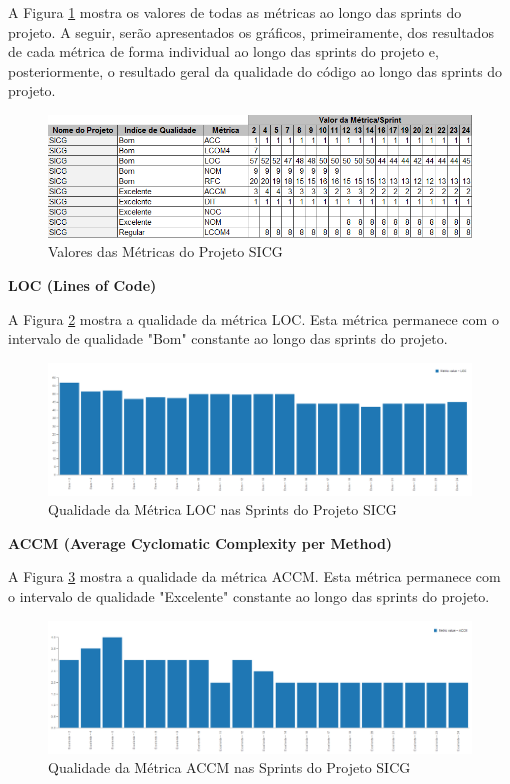 A Figura \ref{metricasprint} mostra os valores de todas as métricas ao longo das sprints do projeto. A seguir, serão apresentados os gráficos, primeiramente, dos resultados de cada métrica de forma individual ao longo das sprints do projeto e, posteriormente, o resultado geral da qualidade do código ao longo das sprints do projeto.

\begin{figure}[H]
		\centering
			\includegraphics[scale=0.8]{figuras/metricasprint.png}
		\caption{Valores das Métricas do Projeto SICG}
		\label{metricasprint}
\end{figure}


\textbf{LOC (Lines of Code)}

A Figura \ref{loc} mostra a qualidade da métrica LOC. Esta métrica permanece com o intervalo de qualidade "Bom" constante ao longo das sprints do projeto.

\begin{figure}[H]
		\centering
			\includegraphics[scale=0.4]{figuras/loc.png}
		\caption{Qualidade da Métrica LOC nas Sprints do Projeto SICG}
		\label{loc}
\end{figure}

\textbf{ACCM (Average Cyclomatic Complexity per Method)}

A Figura \ref{accm} mostra a qualidade da métrica ACCM. Esta métrica permanece com o intervalo de qualidade "Excelente" constante ao longo das sprints do projeto.

\begin{figure}[H]
		\centering
			\includegraphics[scale=0.4]{figuras/accm.png}
		\caption{Qualidade da Métrica ACCM nas Sprints do Projeto SICG}
		\label{accm}
\end{figure}

